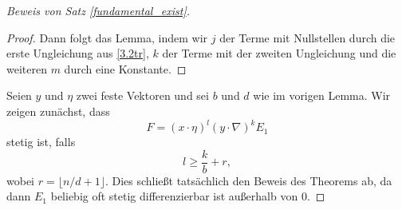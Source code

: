 \begin{proof}[Beweis von Satz \ref{fundamental_exist}]
\begin{proof}
Dann folgt das Lemma, indem wir $j$ der Terme mit Nullstellen durch die erste Ungleichung aus \eqref{3.2tr}, $k$ der Terme mit der zweiten Ungleichung und die weiteren $m$ durch eine Konstante.  
\end{proof}
Seien $y$ und $\eta$ zwei feste Vektoren und sei $b$ und $d$ wie im vorigen Lemma.  Wir zeigen zunächst, dass
\begin{equation}
F= (x\cdot \eta)^l (y \cdot \nabla)^k E_1
\end{equation}
stetig ist, falls
\begin{equation}\label{3.2l}
l\ge \frac{k}{b}+r, %
\end{equation}
wobei $r=\lfloor n/d +1\rfloor$.  Dies schließt tatsächlich den Beweis des Theorems ab, da dann $E_1$ beliebig oft stetig differenzierbar ist außerhalb von $0$.  %


\end{proof}
